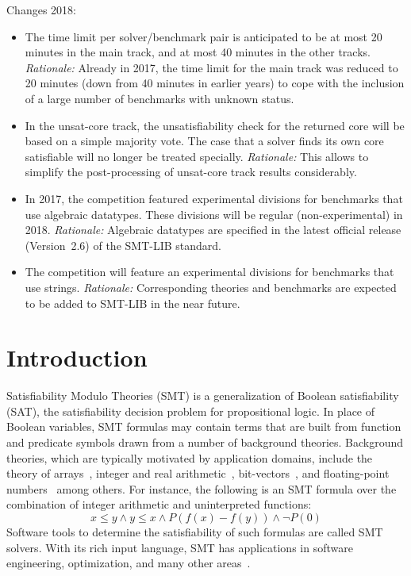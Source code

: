 \documentclass[twoside,11pt]{article}
\begin{document}
\begin{tjark}
Changes 2018:
\begin{itemize}
\item The time limit per solver/benchmark pair is anticipated to be at
  most 20 minutes in the main track, and at most 40 minutes in the
  other tracks.  \emph{Rationale:} Already in 2017, the time limit for
  the main track was reduced to 20 minutes (down from 40 minutes in
  earlier years) to cope with the inclusion of a large number of
  benchmarks with unknown status.
\item In the unsat-core track, the unsatisfiability check for the
  returned core will be based on a simple majority vote.  The case
  that a solver finds its own core satisfiable will no longer be
  treated specially.  \emph{Rationale:} This allows to simplify the
  post-processing of unsat-core track results considerably.
\item In 2017, the competition featured experimental divisions for
  benchmarks that use algebraic datatypes.  These divisions will be
  regular (non-experimental) in 2018. \emph{Rationale:} Algebraic
  datatypes are specified in the latest official release (Version~2.6)
  of the SMT-LIB standard.
\item The competition will feature an experimental divisions for
  benchmarks that use strings.  \emph{Rationale:} Corresponding
  theories and benchmarks are expected to be added to SMT-LIB in the
  near future.
\end{itemize}
\end{tjark}

\section{Introduction}
\label{sec:intro}

Satisfiability Modulo Theories (SMT) is a generalization of Boolean
satisfiability (SAT), the satisfiability decision problem for
propositional logic.  In place of Boolean variables, SMT formulas may
contain terms that are built from function and predicate symbols drawn
from a number of background theories.  Background theories, which are
typically motivated by application domains, include the theory of
arrays~\cite{TODO}, integer and real arithmetic~\cite{TODO},
bit-vectors~\cite{TODO}, and floating-point numbers~\cite{TODO} among
others.  For instance, the following is an SMT formula over the
combination of integer arithmetic and uninterpreted functions:
%
$$x \leq y \wedge y \leq x \wedge P (f(x) - f(y)) \wedge \neg P(0)$$
%
Software tools to determine the satisfiability of such formulas are
called SMT solvers.  With its rich input language, SMT has
applications in software engineering, optimization, and many other
areas~\cite{DeMoura:2011:SMT}.
\end{document}
